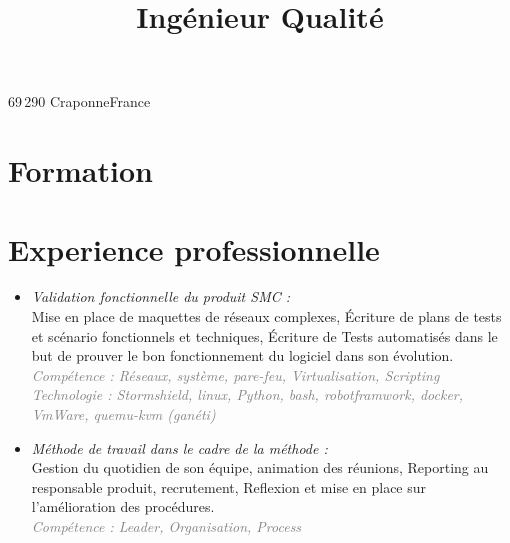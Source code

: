 

\title{Ingénieur Qualité} 
\address{57, place des mimosas}{69\,290 Craponne}{France}


\makecvtitle
\section{Formation}
\section{Experience professionnelle}
		{
			\begin{itemize}
			\item \textit{Validation fonctionnelle du produit SMC :}\\
			\tabto{0.3cm} Mise en place de maquettes de réseaux complexes, Écriture de plans de tests et scénario fonctionnels et techniques, Écriture de Tests automatisés dans le but de prouver le bon fonctionnement du logiciel dans son évolution.\\
			\textcolor{gray}{\emph{\scriptsize{Compétence : Réseaux, système, pare-feu, Virtualisation, Scripting}}}\\
			\textcolor{gray}{\emph{\scriptsize{Technologie : Stormshield, linux, Python, bash, robotframwork, docker, VmWare, quemu-kvm (ganéti)}}}
			\end{itemize}
			\begin{itemize}
			\item \textit{Méthode de travail dans le cadre de la méthode :}\\
			\tabto{0.3cm} Gestion du quotidien de son équipe, animation des réunions, Reporting au responsable produit, recrutement, Reflexion et mise en place sur l'amélioration des procédures.\\
			\textcolor{gray}{\emph{\scriptsize{Compétence : Leader, Organisation, Process}}}
			\end{itemize}
		}
